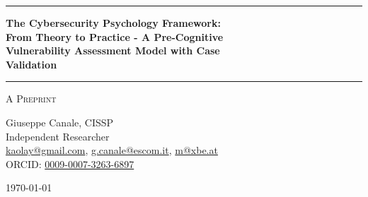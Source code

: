 \documentclass[11pt,a4paper]{article}
\begin{document}
\thispagestyle{empty}
\begin{center}

\vspace*{0.5cm}

\rule{\textwidth}{1.5pt}

\vspace{0.5cm}

{\LARGE \textbf{The Cybersecurity Psychology Framework:}}\\[0.3cm]
{\LARGE \textbf{From Theory to Practice - A Pre-Cognitive}}\\[0.3cm]
{\LARGE \textbf{Vulnerability Assessment Model with Case }}\\[0.3cm]
{\LARGE \textbf{Validation}}

\vspace{0.5cm}

\rule{\textwidth}{1.5pt}

\vspace{0.3cm}

{\large \textsc{A Preprint}}

\vspace{0.5cm}

{\Large Giuseppe Canale, CISSP}\\[0.2cm]
Independent Researcher\\[0.1cm]
\href{mailto:kaolay@gmail.com}{kaolay@gmail.com}, 
\href{mailto:g.canale@escom.it}{g.canale@escom.it}, 
\href{mailto:m@xbe.at}{m@xbe.at}\\[0.1cm]
ORCID: \href{https://orcid.org/0009-0007-3263-6897}{0009-0007-3263-6897}

\vspace{0.8cm}

{\large \today}

\vspace{1cm}

\end{center}
\end{document}
